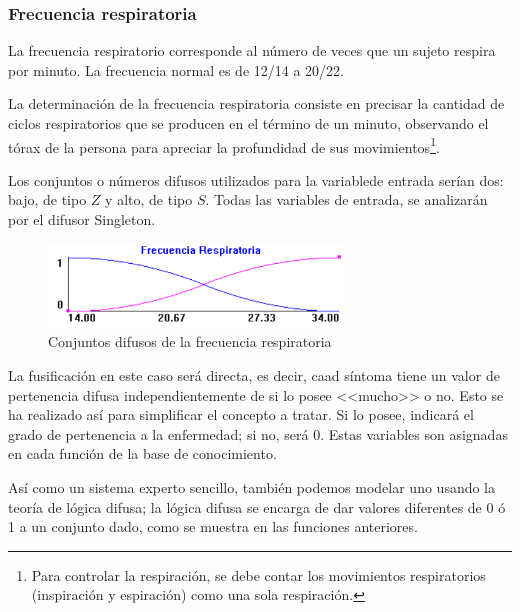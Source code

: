 \documentclass[a4paper, 11pt, titlepage]{article}
\begin{document}
        \subsubsection{Frecuencia respiratoria} 
        
        La frecuencia respiratorio corresponde al número de veces que 
        un sujeto respira por minuto. La frecuencia normal es de 12/14 a 20/22. 
        
        La determinación de la frecuencia respiratoria consiste  en  precisar  la  cantidad  de  ciclos 
        respiratorios  que  se producen  en  el  término  de  un  minuto,  observando  el  tórax  de  la  
        persona  para apreciar la profundidad de sus movimientos\footnote{
            Para controlar la respiración, se debe contar  los  movimientos  respiratorios  (inspiración  y  
            espiración)  como  una  sola respiración.
        }.

        Los conjuntos o números difusos utilizados para la variablede entrada serían dos: bajo, de tipo $Z$ y 
        alto, de tipo $S$. Todas las variables de entrada, se analizarán por el difusor Singleton.

        \begin{figure}[htp]
            \centering
            \includegraphics[width=0.7\textwidth]{resources/frecuenciarespiratoria.png}
            \caption{Conjuntos difusos de la frecuencia respiratoria}
            \label{frecuenciarespiratoria}
        \end{figure}

        La fusificación en este caso será directa, es decir, caad síntoma tiene un valor de pertenencia difusa
        independientemente de si lo posee <<mucho>> o no. Esto se ha realizado así para simplificar el concepto 
        a tratar. Si lo posee, indicará el grado de pertenencia a la enfermedad; si no, será 0. Estas variables 
        son asignadas en cada función de la base de conocimiento.

        Así como un sistema experto sencillo, también podemos modelar uno usando la teoría de lógica difusa; 
        la lógica difusa se encarga de dar valores diferentes de 0 ó 1 a un conjunto dado, como se muestra 
        en las funciones anteriores.
\end{document}
